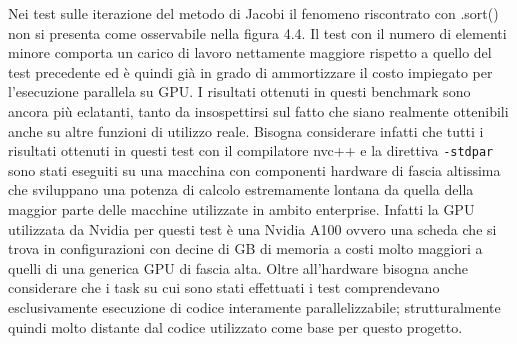 \documentclass[12pt,a4paper]{report}
\begin{document}
\begin{figure}[H]
\centering
\begin{floatrow}[1]
\end{floatrow}
\end{figure} 

Nei test sulle iterazione del metodo di Jacobi il fenomeno riscontrato con .sort() non si presenta come osservabile nella figura 4.4. Il test con il numero di elementi minore comporta un carico di lavoro nettamente maggiore rispetto a quello del test precedente ed è quindi già in grado di ammortizzare il costo impiegato per l'esecuzione parallela su GPU.
I risultati ottenuti in questi benchmark sono ancora più eclatanti, tanto da insospettirsi sul fatto che siano realmente ottenibili anche su altre funzioni di utilizzo reale. \newline
Bisogna considerare infatti che tutti i risultati ottenuti in questi test con il compilatore nvc++ e la direttiva \verb|-stdpar| sono stati eseguiti su una macchina con componenti hardware di fascia altissima che sviluppano una potenza di calcolo estremamente lontana da quella della maggior parte delle macchine utilizzate in ambito enterprise. Infatti la GPU utilizzata da Nvidia per questi test è una Nvidia A100 ovvero una scheda che si trova in configurazioni con decine di GB di memoria a costi molto maggiori a quelli di una generica GPU di fascia alta. \newline
Oltre all'hardware bisogna anche considerare che i task su cui sono stati effettuati i test comprendevano esclusivamente esecuzione di codice interamente parallelizzabile; strutturalmente quindi molto distante dal codice utilizzato come base per questo progetto.
\end{document}
